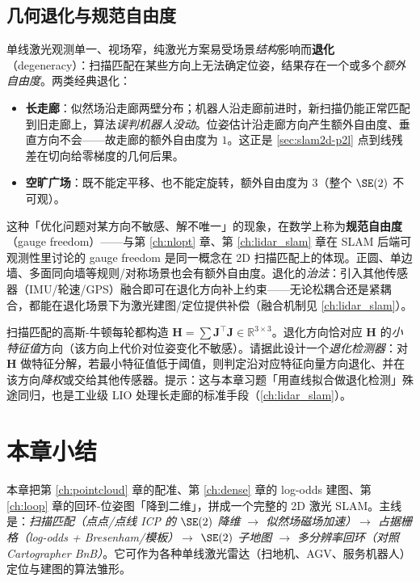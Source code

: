\subsection{几何退化与规范自由度}
\label{sec:slam2d-degeneracy}

单线激光观测单一、视场窄，纯激光方案易受场景\emph{结构}影响而\textbf{退化}（degeneracy）：扫描匹配在某些方向上无法确定位姿，结果存在一个或多个\emph{额外自由度}。两类经典退化：
\begin{itemize}
  \item \textbf{长走廊}：似然场沿走廊两壁分布；机器人沿走廊前进时，新扫描仍能正常匹配到旧走廊上，算法\emph{误判机器人没动}。位姿估计沿走廊方向产生额外自由度、垂直方向不会——故走廊的额外自由度为 $1$。这正是 \cref{sec:slam2d-p2l} 点到线残差在切向给零梯度的几何后果。
  \item \textbf{空旷广场}：既不能定平移、也不能定旋转，额外自由度为 $3$（整个 $\SE(2)$ 不可观）。
\end{itemize}
这种「优化问题对某方向不敏感、解不唯一」的现象，在数学上称为\textbf{规范自由度}（gauge freedom）——与第 \cref{ch:nlopt} 章、第 \cref{ch:lidar_slam} 章在 SLAM 后端可观测性里讨论的 gauge freedom 是同一概念在 2D 扫描匹配上的体现。正圆、单边墙、多面同向墙等规则/对称场景也会有额外自由度。退化的\emph{治法}：引入其他传感器（IMU/轮速/GPS）融合即可在退化方向补上约束——无论松耦合还是紧耦合，都能在退化场景下为激光建图/定位提供补偿（融合机制见 \cref{ch:lidar_slam}）。

\begin{practice}
扫描匹配的高斯-牛顿每轮都构造 $\mathbf{H}=\sum\mathbf{J}^\top\mathbf{J}\in\mathbb{R}^{3\times 3}$。退化方向恰对应 $\mathbf{H}$ 的\emph{小特征值}方向（该方向上代价对位姿变化不敏感）。请据此设计一个\emph{退化检测器}：对 $\mathbf{H}$ 做特征分解，若最小特征值低于阈值，则判定沿对应特征向量方向退化、并在该方向\emph{降权}或交给其他传感器。提示：这与本章习题「用直线拟合做退化检测」殊途同归，也是工业级 LIO 处理长走廊的标准手段（\cref{ch:lidar_slam}）。
\end{practice}

\section*{本章小结}

本章把第 \cref{ch:pointcloud} 章的配准、第 \cref{ch:dense} 章的 log-odds 建图、第 \cref{ch:loop} 章的回环-位姿图「降到二维」，拼成一个完整的 2D 激光 SLAM。主线是：\emph{扫描匹配（点点/点线 ICP 的 $\SE(2)$ 降维 $\to$ 似然场磁场加速）$\to$ 占据栅格（log-odds + Bresenham/模板）$\to$ $\SE(2)$ 子地图 $\to$ 多分辨率回环（对照 Cartographer BnB）}。它可作为各种单线激光雷达（扫地机、AGV、服务机器人）定位与建图的算法雏形。

